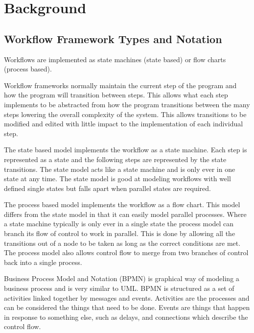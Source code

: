 \documentclass[document.tex]{subfiles}
\begin{document}
\chapter {Background}
\label {ch:background}


\section {Workflow Framework Types and Notation}
\label {sec:overview-of-workflows}


Workflows are implemented as state machines (state based) or flow charts (process based).

Workflow frameworks normally maintain the current step of the program and how the program will transition between steps. This allows what each step implements to be abstracted from how the program transitions between the many steps lowering the overall complexity of the system. This allows transitions to be modified and edited with little impact to the implementation of each individual step.

The state based model implements the workflow as a state machine. Each step is represented as a state and the following steps are represented by the state transitions. The state model acts like a state machine and is only ever in one state at any time. The state model is good at modeling workflows with well defined single states but falls apart when parallel states are required.

The process based model implements the workflow as a flow chart. This model differs from the state model in that it can easily model parallel processes. Where a state machine typically is only ever in a single state the process model can branch its flow of control to work in parallel. This is done by allowing all the transitions out of a node to be taken as long as the correct conditions are met. The process model also allows control flow to merge from two branches of control back into a single process.

Business Process Model and Notation (BPMN) is graphical way of modeling a business process and is very similar to UML. BPMN is structured as a set of activities linked together by messages and events. Activities are the processes and can be considered the things that need to be done. Events are things that happen in response to something else, such as delays, and connections which describe the control flow.
\end{document}
